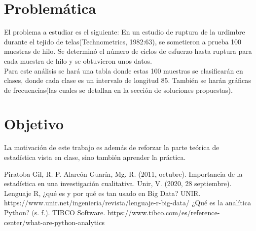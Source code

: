 \documentclass{report}
\begin{document}
\section{Problemática}
El problema a estudiar es el siguiente: En un estudio de ruptura de la urdimbre durante el tejido de telas(Technometrics, 1982:63), se sometieron a prueba 100 muestras de hilo. Se determinó el número de ciclos de esfuerzo hasta ruptura para cada muestra de hilo y se obtuvieron unos datos.\\
Para este análisis se hará una tabla donde estas 100 muestras se clasificarán en clases, donde cada clase es un intervalo de longitud 85. También se harán gráficas de frecuencias(las cuales se detallan en la sección de soluciones propuestas).
\section{Objetivo}
La motivación de este trabajo es además de reforzar la parte teórica de estadística vista en clase, sino también aprender la práctica.

\begin{thebibliography}{8}
Piratoba Gil, R. P. Alarcón Guarín, Mg. R. (2011, octubre). Importancia de la estadística en una investigación cualitativa.
Unir, V. (2020, 28 septiembre). Lenguaje R, ¿qué es y por qué es tan usado en Big Data? UNIR. https://www.unir.net/ingenieria/revista/lenguaje-r-big-data/
¿Qué es la analítica Python? (s. f.). TIBCO Software. https://www.tibco.com/es/reference-center/what-are-python-analytics
\end{thebibliography}
\end{document}
